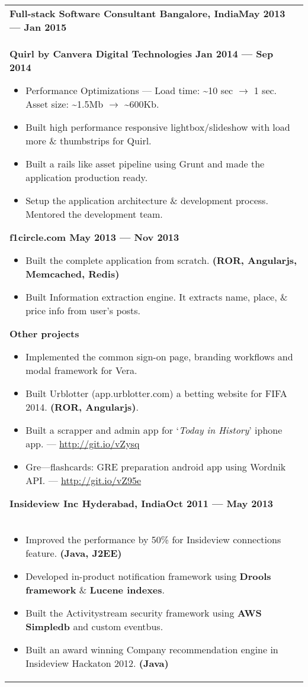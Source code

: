 \documentclass{article}
\begin{document}
\begin{tabular}{p{\dimexpr\linewidth-2\tabcolsep}}
    \bigskip
    {\bfseries Full-stack Software Consultant \hfill Bangalore, India\hfill May 2013 --- Jan 2015}\\
    \smallskip
    \bfseries \enskip{} Quirl by Canvera Digital Technologies \hfill Jan 2014 --- Sep 2014 \mdseries
    \smallskip
    \begin{itemize}
        \item Performance Optimizations --- Load time: \textasciitilde10 sec \( \rightarrow \) 1 sec. Asset size: \textasciitilde1.5Mb \( \rightarrow \) \textasciitilde600Kb.
        \item Built high performance responsive lightbox/slideshow with load more \& thumbstrips for Quirl.
        \item Built a rails like asset pipeline using Grunt and made the application production ready.
        \item Setup the application architecture \& development process. Mentored the development team.
    \end{itemize}
    \bigskip
    \bfseries \enskip{} f1circle.com \hfill May 2013 --- Nov 2013 \mdseries 
    \smallskip
    \begin{itemize}
        \item Built the complete application from scratch. \textbf{(ROR, Angularjs, Memcached, Redis)}
        \item Built Information extraction engine. It extracts name, place, \& price info from user's posts.
    \end{itemize}
    \bigskip
    \bfseries \enskip{} Other projects  \mdseries
    \smallskip
    \begin{itemize}
        \item Implemented the common sign-on page, branding workflows and modal framework for Vera.
        \item Built Urblotter (app.urblotter.com) a betting website for FIFA 2014. \textbf{(ROR, Angularjs)}.
        \item Built a scrapper and admin app for `\textit{Today in History}' iphone app. --- \url{http://git.io/vZysq}
        \item Gre---flashcards: GRE preparation android app using Wordnik API\@. --- \url{http://git.io/vZ95e}
    \end{itemize}
    \bigskip
    \smallskip

    {\bfseries Insideview Inc \hfill Hyderabad, India\hfill Oct 2011 --- May 2013} \\
    \begin{itemize}
      \item Improved the performance by 50\% for Insideview connections feature. \textbf{(Java, J2EE)}
      \item Developed in-product notification framework using \textbf{Drools framework} \& \textbf{Lucene indexes}.
      \item Built the Activitystream security framework using \textbf{AWS Simpledb} and custom eventbus.
    \item Built an award winning Company recommendation engine in Insideview Hackaton 2012. \textbf{(Java)}
    \end{itemize}


\end{tabular}
\end{document}
